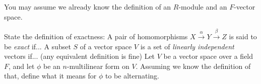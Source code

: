 \documentclass{exam}
\begin{document}
\begin{center}
\end{center}

\vspace*{1em}
You may assume we already know the definition of an $R$-module and an $F$-vector space.
\begin{questions}
    \question[2]
        State the definition of exactness: A pair of homomorphisms $X\stackrel{\alpha}{\to}Y\stackrel{\beta}{\to}Z$ is said to 
        be \textit{exact} if...
    \question[2]
        A subset $S$ of a vector space $V$ is a set of \textit{linearly independent} vectors if... (any equivalent definition is fine)
    \question[1]
        Let $V$ be a vector space over a field $F$, and let $\phi$ be an $n$-multilinear form on $V$. Assuming we know the definition of that, define what it means for $\phi$ to be alternating.
\end{questions}
\end{document}

